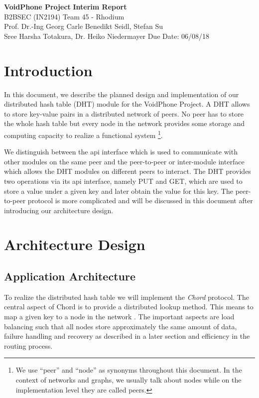 \documentclass[a4paper, 11pt]{article}
\begin{document}
\noindent
\large\textbf{VoidPhone Project} \hfill \textbf{Interim Report}\\
\normalsize B2BSEC (IN2194)  \hfill Team 45 - Rhodium\\
Prof. Dr.-Ing Georg Carle \hfill Benedikt Seidl, Stefan Su\\
Sree Harsha Totakura, Dr. Heiko Niedermayer \hfill Due Date: 06/08/18

\section{Introduction}

In this document, we describe the planned design and implementation of our distributed hash table (DHT) module for the VoidPhone Project. A DHT allows to store key-value pairs in a distributed network of peers. No peer has to store the whole hash table but every node in the network provides some storage and computing capacity to realize a functional system \footnote{We use ``peer'' and ``node'' as synonyms throughout this document. In the context of networks and graphs, we usually talk about nodes while on the implementation level they are called peers.}.

We distinguish between the api interface which is used to communicate with other modules on the same peer and the peer-to-peer or inter-module interface which allows the DHT modules on different peers to interact. The DHT provides two operations via its api interface, namely PUT and GET, which are used to store a value under a given key and later obtain the value for this key. The peer-to-peer protocol is more complicated and will be discussed in this document after introducing our architecture design.

\section{Architecture Design}

\subsection{Application Architecture}

To realize the distributed hash table we will implement the \textit{Chord} protocol. The central aspect of Chord is to provide a distributed lookup method. This means to map a given key to a node in the network \cite{Chord}. The important aspects are load balancing such that all nodes store approximately the same amount of data, failure handling and recovery as described in a later section and efficiency in the routing process.
\end{document}
